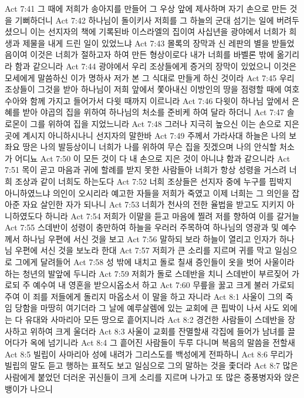 Act 7:41  그 때에 저희가 송아지를 만들어 그 우상 앞에 제사하며 자기 손으로 만든 것을 기뻐하더니
Act 7:42  하나님이 돌이키사 저희를 그 하늘의 군대 섬기는 일에 버려두셨으니 이는 선지자의 책에 기록된바 이스라엘의 집이여 사십년을 광야에서 너희가 희생과 제물을 내게 드린 일이 있었느냐
Act 7:43  몰록의 장막과 신 레판의 별을 받들었음이여 이것은 너희가 절하고자 하여 만든 형상이로다 내가 너희를 바벨론 밖에 옮기리라 함과 같으니라
Act 7:44  광야에서 우리 조상들에게 증거의 장막이 있었으니 이것은 모세에게 말씀하신 이가 명하사 저가 본 그 식대로 만들게 하신 것이라
Act 7:45  우리 조상들이 그것을 받아 하나님이 저희 앞에서 쫓아내신 이방인의 땅을 점령할 때에 여호수아와 함께 가지고 들어가서 다윗 때까지 이르니라
Act 7:46  다윗이 하나님 앞에서 은혜를 받아 야곱의 집을 위하여 하나님의 처소를 준비케 하여 달라 하더니
Act 7:47  솔로몬이 그를 위하여 집을 지었느니라
Act 7:48  그러나 지극히 높으신 이는 손으로 지은 곳에 계시지 아니하시나니 선지자의 말한바
Act 7:49  주께서 가라사대 하늘은 나의 보좌요 땅은 나의 발등상이니 너희가 나를 위하여 무슨 집을 짓겠으며 나의 안식할 처소가 어디뇨
Act 7:50  이 모든 것이 다 내 손으로 지은 것이 아니냐 함과 같으니라
Act 7:51  목이 곧고 마음과 귀에 할례를 받지 못한 사람들아 너희가 항상 성령을 거스려 너희 조상과 같이 너희도 하는도다
Act 7:52  너희 조상들은 선지자 중에 누구를 핍박지 아니하였느냐 의인이 오시리라 예고한 자들을 저희가 죽였고 이제 너희는 그 의인을 잡아준 자요 살인한 자가 되나니
Act 7:53  너희가 천사의 전한 율법을 받고도 지키지 아니하였도다 하니라
Act 7:54  저희가 이말을 듣고 마음에 찔려 저를 향하여 이를 갈거늘
Act 7:55  스데반이 성령이 충만하여 하늘을 우러러 주목하여 하나님의 영광과 및 예수께서 하나님 우편에 서신 것을 보고
Act 7:56  말하되 보라 하늘이 열리고 인자가 하나님 우편에 서신 것을 보노라 한대
Act 7:57  저희가 큰 소리를 지르며 귀를 막고 일심으로 그에게 달려들어
Act 7:58  성 밖에 내치고 돌로 칠새 증인들이 옷을 벗어 사울이라 하는 청년의 발앞에 두니라
Act 7:59  저희가 돌로 스데반을 치니 스데반이 부르짖어 가로되 주 예수여 내 영혼을 받으시옵소서 하고
Act 7:60  무릎을 꿇고 크게 불러 가로되 주여 이 죄를 저들에게 돌리지 마옵소서 이 말을 하고 자니라
Act 8:1  사울이 그의 죽임 당함을 마땅히 여기더라 그 날에 예루살렘에 있는 교회에 큰 핍박이 나서 사도 외에는 다 유대와 사마리아 모든 땅으로 흩어지니라
Act 8:2  경건한 사람들이 스데반을 장사하고 위하여 크게 울더라
Act 8:3  사울이 교회를 잔멸할새 각집에 들어가 남녀를 끌어다가 옥에 넘기니라
Act 8:4  그 흩어진 사람들이 두루 다니며 복음의 말씀을 전할새
Act 8:5  빌립이 사마리아 성에 내려가 그리스도를 백성에게 전파하니
Act 8:6  무리가 빌립의 말도 듣고 행하는 표적도 보고 일심으로 그의 말하는 것을 좇더라
Act 8:7  많은 사람에게 붙었던 더러운 귀신들이 크게 소리를 지르며 나가고 또 많은 중풍병자와 앉은뱅이가 나으니
